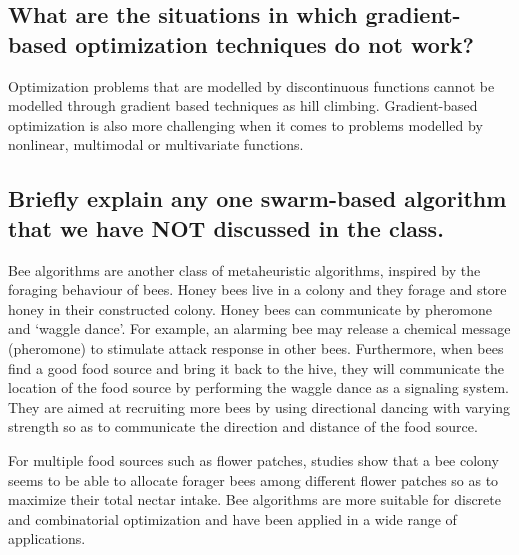 \documentclass[a4paper]{article}
\begin{document}
\subsection{What are the situations 
in which gradient-based optimization techniques do not work? }
Optimization problems that are modelled by discontinuous functions cannot be modelled through gradient based techniques as hill climbing. Gradient-based optimization is also more challenging when it comes to problems
 modelled by nonlinear, multimodal or multivariate functions.
 \subsection{Briefly explain any one swarm-based algorithm 
 that we have NOT discussed in the class.}
 Bee algorithms are another class of metaheuristic algorithms, inspired by the foraging behaviour of bees. Honey bees live in a colony and they forage and store honey in their constructed colony. Honey bees can communicate by pheromone and `waggle dance'. For example, an alarming bee may release a chemical message (pheromone) to stimulate attack response in other bees. Furthermore, when bees find a good food source and bring it back to the hive, they will communicate the location of the food source by performing the waggle dance as a signaling system. They are aimed at recruiting more bees by using directional dancing with varying strength so as to communicate the direction and distance of the food source.
\par For multiple food sources such as flower patches, studies show that a bee colony seems to be able to allocate forager bees among different flower patches so as to maximize their total nectar intake. Bee algorithms are more suitable for discrete and combinatorial optimization and have been applied in a wide range of applications.
\end{document}
